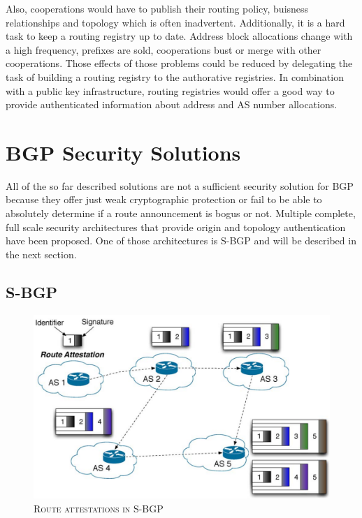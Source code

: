 \documentclass[12pt,a4paper]{IEEEtran}
\begin{document}
			Also, cooperations would have to publish their routing policy, buisness relationships and topology which is often inadvertent.
			Additionally, it is a hard task to keep a routing registry up to date. Address block allocations change with a high frequency, prefixes are sold, cooperations bust or merge with other cooperations. Those effects of those problems could be reduced by delegating the task of building a routing registry to the authorative registries. In combination with a public key infrastructure, routing registries would offer a good way to provide authenticated information about address and AS number allocations.
		
       \section{BGP Security Solutions}

		All of the so far described solutions are not a sufficient security solution for BGP because they offer just weak cryptographic protection or fail to be able to absolutely determine if a route announcement is bogus or not. Multiple complete, full scale security architectures that provide origin and topology authentication have been proposed. One of those architectures is S-BGP and will be described in the next section.
       \subsection{S-BGP}
		\begin{figure}[ht!]
			\begin{center}
				\includegraphics[scale=1.337]{sbgp.png}
				\caption{\textsc{Route attestations in S-BGP}}
			\end{center}
			\label{sbgp}
		\end{figure}
		
\end{document}
